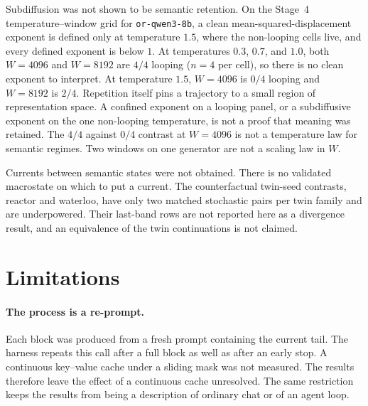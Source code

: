 \documentclass[10pt]{article}
\begin{document}
Subdiffusion was not shown to be semantic retention.
On the Stage~4 temperature--window grid for \texttt{or-qwen3-8b}, a
clean mean-squared-displacement exponent is defined only at temperature
$1.5$, where the non-looping cells live, and every defined exponent is
below $1$. %
At temperatures $0.3$, $0.7$, and $1.0$, both $W{=}4096$ and
$W{=}8192$ are $4/4$ looping ($n{=}4$ per cell), so there is no clean
exponent to interpret. %
At temperature $1.5$, $W{=}4096$ is $0/4$ looping and $W{=}8192$ is
$2/4$. %
Repetition itself pins a trajectory to a small region of representation
space.
A confined exponent on a looping panel, or a subdiffusive exponent on
the one non-looping temperature, is not a proof that meaning was
retained.
The $4/4$ against $0/4$ contrast at $W{=}4096$ is not a temperature law
for semantic regimes.
Two windows on one generator are not a scaling law in $W$.

Currents between semantic states were not obtained.
There is no validated macrostate on which to put a current.
The counterfactual twin-seed contrasts, reactor and waterloo, have only
two matched stochastic pairs per twin family and are underpowered. %
Their last-band rows are not reported here as a divergence result,
and an equivalence of the twin continuations is not claimed.

\section{Limitations}
\label{sec:limitations}

\paragraph{The process is a re-prompt.}
Each block was produced from a fresh prompt containing the current tail.
The harness repeats this call after a full block as well as after an
early stop.
A continuous key--value cache under a sliding mask was not measured.
The results therefore leave the effect of a continuous cache unresolved.
The same restriction keeps the results from being a description of
ordinary chat or of an agent loop.
\end{document}
